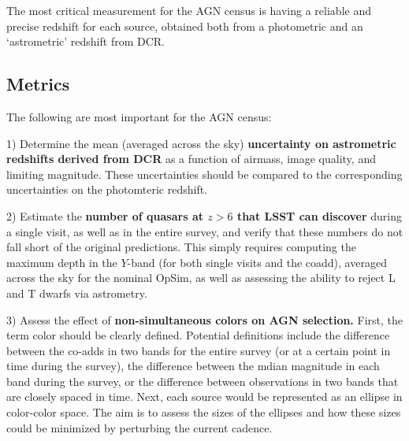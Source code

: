 The most critical measurement for the AGN census is having a reliable
and precise redshift for each source, obtained both from a photometric
and an `astrometric' redshift from DCR.



\subsection{Metrics}
\label{sec:\secname:metrics}



The following are most important for the AGN census:

1) Determine the mean (averaged across the sky) {\bf uncertainty on astrometric
redshifts derived from DCR} as a function of airmass, image quality, and
limiting magnitude. These uncertainties should be compared to the
corresponding uncertainties on the photomteric redshift.

2) Estimate the {\bf number of quasars at $z>6$ that LSST can discover}
during a single visit, as well as in the entire survey, and verify that
these numbers do not fall short of the original predictions. This
simply requires computing the maximum depth in the $Y$-band (for both
single visits and the coadd), averaged across the sky for the nominal
OpSim, as well as assessing the ability to reject L and T dwarfs via astrometry.

3) Assess the effect of {\bf non-simultaneous colors on AGN selection.}
First, the term color should be clearly defined. Potential definitions
include the difference between the co-adds in two bands for the entire
survey (or at a certain point in time during the survey), the difference
between the mdian magnitude in each band during the survey, or the
difference between observations in two bands that are closely spaced in time.
Next, each source would be represented as an ellipse in color-color space.
The aim is to assess the sizes of the ellipses and how these sizes could be
minimized by perturbing the current cadence.


